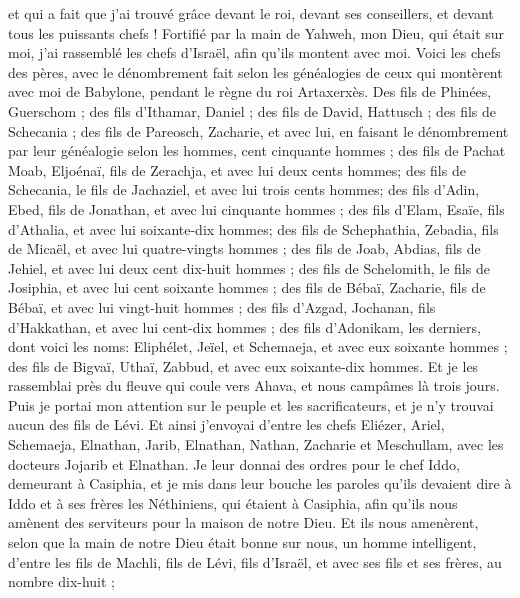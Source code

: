 \begin{multicols}{2}
et qui a fait que j'ai trouvé grâce devant le roi, devant ses conseillers, et devant tous les puissants chefs ! Fortifié par la main de Yahweh, mon Dieu, qui était sur moi, j'ai rassemblé les chefs d'Israël, afin qu'ils montent avec moi.
\VerseOne{}Voici les chefs des pères, avec le dénombrement fait selon les généalogies de ceux qui montèrent avec moi de Babylone, pendant le règne du roi Artaxerxès.
Des fils de Phinées, Guerschom ; des fils d'Ithamar, Daniel ; des fils de David, Hattusch ;
des fils de Schecania ; des fils de Pareosch, Zacharie, et avec lui, en faisant le dénombrement par leur généalogie selon les hommes, cent cinquante hommes ;
des fils de Pachat Moab, Eljoénaï, fils de Zerachja, et avec lui deux cents hommes;
des fils de Schecania, le fils de Jachaziel, et avec lui trois cents hommes;
des fils d'Adin, Ebed, fils de Jonathan, et avec lui cinquante hommes ;
des fils d'Elam, Esaïe, fils d'Athalia, et avec lui soixante-dix hommes;
des fils de Schephathia, Zebadia, fils de Micaël, et avec lui quatre-vingts hommes ;
des fils de Joab, Abdias, fils de Jehiel, et avec lui deux cent dix-huit hommes ;
des fils de Schelomith, le fils de Josiphia, et avec lui cent soixante hommes ;
des fils de Bébaï, Zacharie, fils de Bébaï, et avec lui vingt-huit hommes ;
des fils d'Azgad, Jochanan, fils d'Hakkathan, et avec lui cent-dix hommes ;
des fils d'Adonikam, les derniers, dont voici les noms: Eliphélet, Jeïel, et Schemaeja, et avec eux soixante hommes ;
des fils de Bigvaï, Uthaï, Zabbud, et avec eux soixante-dix hommes.
Et je les rassemblai près du fleuve qui coule vers Ahava, et nous campâmes là trois jours. Puis je portai mon attention sur le peuple et les sacrificateurs, et je n'y trouvai aucun des fils de Lévi.
Et ainsi j'envoyai d'entre les chefs Eliézer, Ariel, Schemaeja, Elnathan, Jarib, Elnathan, Nathan, Zacharie et Meschullam, avec les docteurs Jojarib et Elnathan.
Je leur donnai des ordres pour le chef Iddo, demeurant à Casiphia, et je mis dans leur bouche les paroles qu'ils devaient dire à Iddo et à ses frères les Néthiniens, qui étaient à Casiphia, afin qu'ils nous amènent des serviteurs pour la maison de notre Dieu.
 Et ils nous amenèrent, selon que la main de notre Dieu était bonne sur nous, un homme intelligent, d’entre les fils de Machli, fils de Lévi, fils d'Israël, et avec ses fils et ses frères, au nombre dix-huit ;

\end{multicols}
